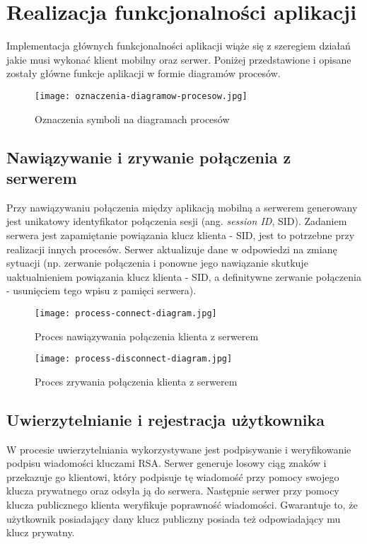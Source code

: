 \documentclass[../main.tex]{subfiles}
\begin{document}
\section{Realizacja funkcjonalności aplikacji}

Implementacja głównych funkcjonalności aplikacji wiąże się z szeregiem działań jakie musi wykonać klient mobilny oraz serwer. Poniżej przedstawione i opisane zostały główne funkcje aplikacji w formie diagramów procesów.

\begin{figure}[H]
	\centering
	\texttt{[image: oznaczenia-diagramow-procesow.jpg]}
	\caption{Oznaczenia symboli na diagramach procesów}
\end{figure}

\subsection{Nawiązywanie i zrywanie połączenia z serwerem}

Przy nawiązywaniu połączenia między aplikacją mobilną a serwerem generowany jest unikatowy identyfikator połączenia sesji (ang. \textit{session ID}, SID). Zadaniem serwera jest zapamiętanie powiązania klucz klienta - SID, jest to potrzebne przy realizacji innych procesów. Serwer aktualizuje dane w odpowiedzi na zmianę sytuacji (np. zerwanie połączenia i ponowne jego nawiązanie skutkuje uaktualnieniem powiązania klucz klienta - SID, a definitywne zerwanie połączenia - usunięciem tego wpisu z pamięci serwera).

\begin{figure}[H]
	\centering
	\texttt{[image: process-connect-diagram.jpg]}
	\caption{Proces nawiązywania połączenia klienta z serwerem}
\end{figure}

\begin{figure}[H]
	\centering
	\texttt{[image: process-disconnect-diagram.jpg]}
	\caption{Proces zrywania połączenia klienta z serwerem}
\end{figure}

\subsection{Uwierzytelnianie i rejestracja użytkownika}

W procesie uwierzytelniania wykorzystywane jest podpisywanie i weryfikowanie podpisu wiadomości kluczami RSA. Serwer generuje losowy ciąg znaków i przekazuje go klientowi, który podpisuje tę wiadomość przy pomocy swojego klucza prywatnego oraz odsyła ją do serwera. Następnie serwer przy pomocy klucza publicznego klienta weryfikuje poprawność wiadomości. Gwarantuje to, że użytkownik posiadający dany klucz publiczny posiada też odpowiadający mu klucz prywatny.
\end{document}
